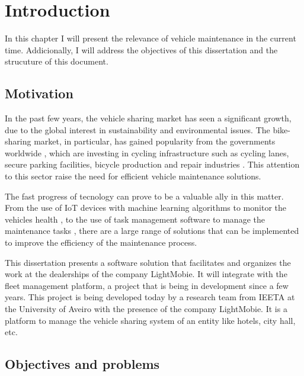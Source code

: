 \chapter{Introduction}%
\label{chapter:introduction}

\begin{introduction}
In this chapter I will present the relevance of vehicle maintenance in the current time. Addicionally, I will address the objectives of this dissertation and the strucuture of this document.
\end{introduction} 


\section{Motivation}

In the past few years, the vehicle sharing market has seen a significant growth, due to the global interest in sustainability and environmental issues. \cite{bike_data_businessresearch}
The bike-sharing market, in particular, has gained popularity from the governments worldwide \cite{Clercq2023} \cite{Cerro2024} \cite{European_declararion_on_cycling} \cite{cohesionOpenData}, which are investing in cycling infrastructure such as cycling lanes, secure parking facilities, bicycle production and repair industries \cite{Cerro2024} \cite{European_declararion_on_cycling} \cite{cohesionOpenData}.
This attention to this sector raise the need for efficient vehicle maintenance solutions.

The fast progress of tecnology can prove to be a valuable ally in this matter. 
From the use of IoT devices with machine learning algorithms to monitor the vehicles health \cite{Vasavi2021}, 
to the use of task management software to manage the maintenance tasks \cite{MARS_MOTORS}, 
there are a large range of solutions that can be implemented to improve the efficiency of the maintenance process.

This dissertation presents a software solution that facilitates and organizes the work at the dealerships of the company LightMobie. 
It will integrate with the fleet management platform, a project that is being in development since a few years. 
This project is being developed today by a research team from  \ac{IEETA} at the University of Aveiro with the presence of the company LightMobie.
It is a platform to manage the vehicle sharing system of an entity like hotels, city hall, etc.  

\section{Objectives and problems}

